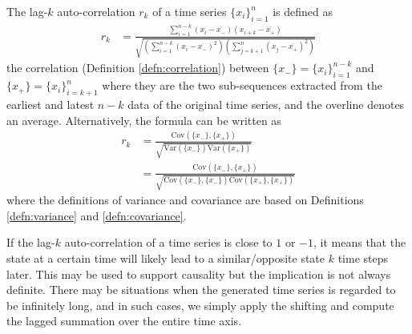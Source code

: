 \begin{defn}
\label{defn:autocorr}
The lag-$k$ auto-correlation $r_k$ of a time series $\{x_i\}_{i=1}^{n}$ is defined as 
\begin{align}
r_k &= \frac{\sum_{i=1}^{n-k}(x_i - \overline{x_{-}})(x_{i+k} - \overline{x_{+}})}{\sqrt{(\sum_{i=1}^{n-k}(x_i - \overline{x_{-}})^2) (\sum_{j=k+1}^{n}(x_j - \overline{x_{+}})^2)}}
\end{align}
the correlation (Definition \ref{defn:correlation}) between $\{x_{-}\} = \{x_i\}_{i=1}^{n-k}$ and $\{x_{+}\} = \{x_i\}_{i=k+1}^{n}$ where they are the two sub-sequences extracted from the earliest and latest $n-k$ data of the original time series, and the overline denotes an average. Alternatively, the formula can be written as
\begin{subequations}
\label{eqn:autocorrvar}
\begin{align}
r_k &= \frac{\text{Cov}(\{x_{-}\},\{x_{+}\})}{\sqrt{\text{Var}(\{x_{-}\}) \text{Var}(\{x_{+}\})}} \\
&= \frac{\text{Cov}(\{x_{-}\},\{x_{+}\})}{\sqrt{\text{Cov}(\{x_{-}\}, \{x_{-}\}) \text{Cov}(\{x_{+}\}, \{x_{+}\})}}
\end{align}   
\end{subequations}
where the definitions of variance and covariance are based on Definitions \ref{defn:variance} and \ref{defn:covariance}.
\end{defn}
If the lag-$k$ auto-correlation of a time series is close to $1$ or $-1$, it means that the state at a certain time will likely lead to a similar/opposite state $k$ time steps later. This may be used to support causality but the implication is not always definite. There may be situations when the generated time series is regarded to be infinitely long, and in such cases, we simply apply the shifting and compute the lagged summation over the entire time axis.

